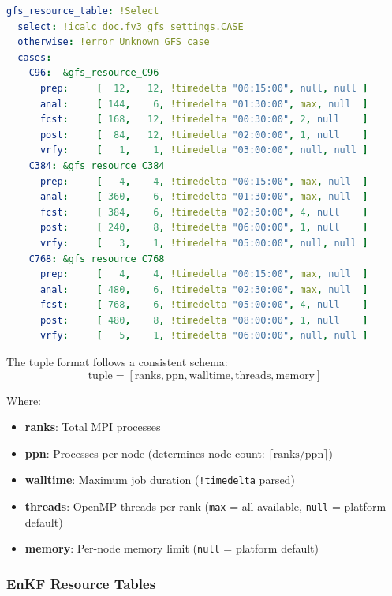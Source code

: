 \documentclass[11pt,twoside]{article}
\newcommand{\crow}{\textsc{CROW}}
\begin{document}
\begin{lstlisting}[language=YAML, caption={\crow{} GFS Resource Table (from \texttt{default\_resources.yaml})}]
gfs_resource_table: !Select
  select: !icalc doc.fv3_gfs_settings.CASE
  otherwise: !error Unknown GFS case 
  cases:
    C96:  &gfs_resource_C96
      prep:     [  12,   12, !timedelta "00:15:00", null, null ]
      anal:     [ 144,    6, !timedelta "01:30:00", max, null  ]
      fcst:     [ 168,   12, !timedelta "00:30:00", 2, null    ]
      post:     [  84,   12, !timedelta "02:00:00", 1, null    ]
      vrfy:     [   1,    1, !timedelta "03:00:00", null, null ]
    C384: &gfs_resource_C384
      prep:     [   4,    4, !timedelta "00:15:00", max, null  ]
      anal:     [ 360,    6, !timedelta "01:30:00", max, null  ]
      fcst:     [ 384,    6, !timedelta "02:30:00", 4, null    ]
      post:     [ 240,    8, !timedelta "06:00:00", 1, null    ]
      vrfy:     [   3,    1, !timedelta "05:00:00", null, null ]
    C768: &gfs_resource_C768
      prep:     [   4,    4, !timedelta "00:15:00", max, null  ]
      anal:     [ 480,    6, !timedelta "02:30:00", max, null  ]
      fcst:     [ 768,    6, !timedelta "05:00:00", 4, null    ]
      post:     [ 480,    8, !timedelta "08:00:00", 1, null    ]
      vrfy:     [   5,    1, !timedelta "06:00:00", null, null ]
\end{lstlisting}

The tuple format follows a consistent schema:
\begin{equation}
\text{tuple} = [\text{ranks}, \text{ppn}, \text{walltime}, \text{threads}, \text{memory}]
\end{equation}

Where:
\begin{itemize}[leftmargin=2em]
    \item \textbf{ranks}: Total MPI processes
    \item \textbf{ppn}: Processes per node (determines node count: $\lceil \text{ranks}/\text{ppn} \rceil$)
    \item \textbf{walltime}: Maximum job duration (\texttt{!timedelta} parsed)
    \item \textbf{threads}: OpenMP threads per rank (\texttt{max} = all available, \texttt{null} = platform default)
    \item \textbf{memory}: Per-node memory limit (\texttt{null} = platform default)
\end{itemize}

\subsubsection{EnKF Resource Tables}
\end{document}
